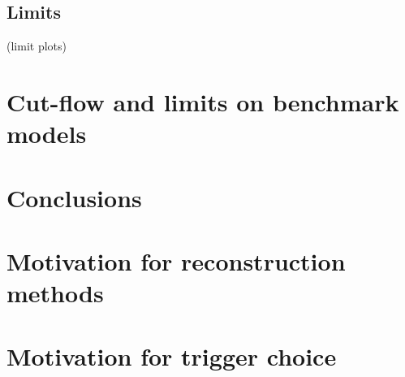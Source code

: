 \documentclass[12pt]{cms-tdr}
\begin{document}
\subsection{Limits}

(limit plots)

\section{Cut-flow and limits on benchmark models}

\section{Conclusions}

\appendix

\section{Motivation for reconstruction methods}

\section{Motivation for trigger choice}
\label{sec:motivation_for_trigger_choice}
\end{document}
